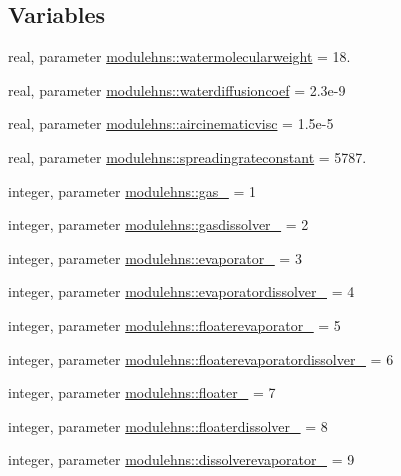 \subsection*{Variables}
\begin{DoxyCompactItemize}
\item 
real, parameter \mbox{\hyperlink{namespacemodulehns_aad6ce5a9588d71fd220382594f3ebead}{modulehns\+::watermolecularweight}} = 18.
\item 
real, parameter \mbox{\hyperlink{namespacemodulehns_aefafa2b5510ebc07de11b9d21aa664ba}{modulehns\+::waterdiffusioncoef}} = 2.\+3e-\/9
\item 
real, parameter \mbox{\hyperlink{namespacemodulehns_aaa60d48f4a69de776e4d6d3c202a822a}{modulehns\+::aircinematicvisc}} = 1.\+5e-\/5
\item 
real, parameter \mbox{\hyperlink{namespacemodulehns_ad84ee382328093946ea2771a16dbaa41}{modulehns\+::spreadingrateconstant}} = 5787.
\item 
integer, parameter \mbox{\hyperlink{namespacemodulehns_aef3a83c33839f6914b9e84080e96d98b}{modulehns\+::gas\+\_\+}} = 1
\item 
integer, parameter \mbox{\hyperlink{namespacemodulehns_a5988a9ef40c61141e18e7a4142e26c66}{modulehns\+::gasdissolver\+\_\+}} = 2
\item 
integer, parameter \mbox{\hyperlink{namespacemodulehns_a1c4da7f59d93e9880ab1dfe83261e4d9}{modulehns\+::evaporator\+\_\+}} = 3
\item 
integer, parameter \mbox{\hyperlink{namespacemodulehns_a444efbb573a36e11ac20ebc867ec732f}{modulehns\+::evaporatordissolver\+\_\+}} = 4
\item 
integer, parameter \mbox{\hyperlink{namespacemodulehns_a5f5d37f56b892349502cbcb42287a505}{modulehns\+::floaterevaporator\+\_\+}} = 5
\item 
integer, parameter \mbox{\hyperlink{namespacemodulehns_adf7de4913f5ef154bbdc3c38a14d837f}{modulehns\+::floaterevaporatordissolver\+\_\+}} = 6
\item 
integer, parameter \mbox{\hyperlink{namespacemodulehns_acca937d62ed3b694dc28629fdee08561}{modulehns\+::floater\+\_\+}} = 7
\item 
integer, parameter \mbox{\hyperlink{namespacemodulehns_a065860e13c610ed17fc54cbb69420b06}{modulehns\+::floaterdissolver\+\_\+}} = 8
\item 
integer, parameter \mbox{\hyperlink{namespacemodulehns_afee2c4aee2b6391f2f16da4601cb64ac}{modulehns\+::dissolverevaporator\+\_\+}} = 9
\item 

\end{DoxyCompactItemize}
